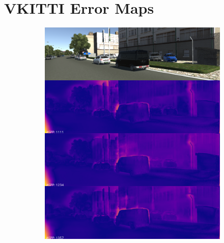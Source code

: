 \section{VKITTI Error Maps}
\begin{figure}[h!]
\centering
\begin{subfigure}[c]{0.24\textwidth}
\includegraphics[width=\textwidth]{images/visual_comparisons/aspp-rates-vkitti/concat_221.png}
\end{subfigure}
\begin{subfigure}[c]{0.24\textwidth}

\end{subfigure}
\end{figure}
